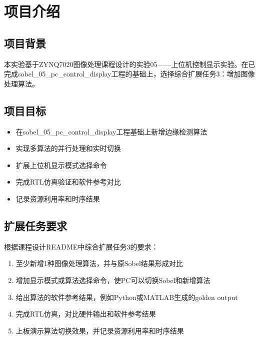 
\section{项目介绍}

\subsection{项目背景}

本实验基于ZYNQ7020图像处理课程设计的实验05——上位机控制显示实验。在已完成sobel\_05\_pc\_control\_display工程的基础上，选择综合扩展任务3：增加图像处理算法。

\subsection{项目目标}

\begin{itemize}
    \item 在sobel\_05\_pc\_control\_display工程基础上新增边缘检测算法
    \item 实现多算法的并行处理和实时切换
    \item 扩展上位机显示模式选择命令
    \item 完成RTL仿真验证和软件参考对比
    \item 记录资源利用率和时序结果
\end{itemize}

\subsection{扩展任务要求}

根据课程设计README中综合扩展任务3的要求：

\begin{enumerate}
    \item 至少新增1种图像处理算法，并与原Sobel结果形成对比
    \item 增加显示模式或算法选择命令，使PC可以切换Sobel和新增算法
    \item 给出算法的软件参考结果，例如Python或MATLAB生成的golden output
    \item 完成RTL仿真，对比硬件输出和软件参考结果
    \item 上板演示算法切换效果，并记录资源利用率和时序结果
\end{enumerate}
